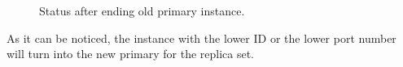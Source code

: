 \begin{figure}[!h]
    \begin{center}
        \caption{Status after ending old primary instance.}
    \end{center}
\end{figure}

As it can be noticed, the instance with the lower ID or the lower port number
will turn into the new primary for the replica set.